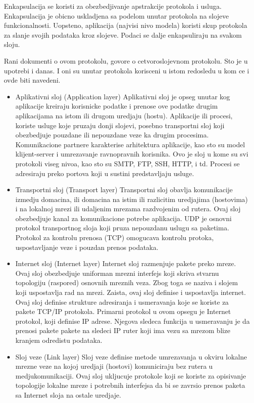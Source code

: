 \documentclass[a4paper,12pt, master]{etf}
\begin{document}
	Enkapsulacija se koristi za obezbedjivanje apstrakcije protokola i usluga. Enkapsulacija je 
	obicno uskladjena sa podelom unutar protokola na slojeve funkcionalnosti. Uopsteno, 
	aplikacija (najvisi nivo modela) koristi skup protokola za slanje svojih podataka kroz 
	slojeve. Podaci se dalje enkapsuliraju na svakom sloju.

	Rani dokumenti o ovom protokolu, govore o cetvoroslojevnom protokolu. Sto je u upotrebi i 
	danas. I oni su unutar protokola korisceni u istom redosledu u kom ce i ovde biti navedeni.

	\begin{itemize}
		\item Aplikativni sloj (Application layer)
		Aplikativni sloj je opseg unutar kog aplikacije kreiraju korisnicke podatke i prenose 
		ove podatke drugim aplikacijama na istom ili drugom uredjaju (hostu). Aplikacije ili 
		procesi, koriste usluge koje pruzaju donji slojevi, posebno transportni sloj koji 
		obezbedjuje pouzdane ili nepouzdane veze ka drugim procesima. Komunikacione partnere 
		karakterise arhitektura aplikacije, kao sto su model klijent-server i umrezavanje 
		ravnopravnih korisnika. Ovo je sloj u kome su svi protokoli viseg nivoa, kao sto su SMTP,
		 FTP, SSH, HTTP, i td. Procesi se adresiraju preko portova koji u sustini predstavljaju 
		 usluge.
		\item Transportni sloj (Transport layer)
		Transportni sloj obavlja komunikacije izmedju domacina, ili domacina na istim ili 
		razlicitim uredjajima (hostovima) i na lokalnoj mrezi ili udaljenim mrezama razdvojenim 
		od rutera. Ovaj sloj obezbedjuje kanal za komunikacione potrebe aplikacija. UDP je 
		osnovni protokol transportnog sloja koji pruza nepouzdanu uslugu sa paketima. Protokol 
		za kontrolu prenosa (TCP) omogucava kontrolu protoka, uspostavljanje veze i pouzdan 
		prenos podataka.
		\item Internet sloj (Internet layer)
		Internet sloj razmenjuje pakete preko mreze. Ovaj sloj obezbedjuje uniforman mrezni 
		interfejs koji skriva stvarnu topologiju (raspored) osnovnih mreznih veza. Zbog toga se 
		naziva i slojem koji uspostavlja rad na mrezi. Zaista, ovaj sloj definise i uspostavlja 
		internet. Ovaj sloj definise strukture adresiranja i usmeravanja koje se koriste za 
		pakete TCP/IP protokola. Primarni protokol u ovom opsegu je Internet protokol, koji 
		definise IP adrese. Njegova sledeca funkcija u usmeravanju je da prenosi pakete pakete 
		na sledeci IP ruter koji ima vezu sa mrezom blize kranjem odredistu podataka.	
		\item Sloj veze (Link layer)
		Sloj veze definise metode umrezavanja u okviru lokalne mrezne veze na kojoj uredjaji 
		(hostovi) komuniciraju bez rutera u medjukomunikaciji. Ovaj sloj ukljucuje protokole 
		koji se koriste za opisivanje topologije lokalne mreze i potrebnih interfejsa da bi se 
		zavrsio prenos paketa sa Internet sloja na ostale uredjaje.
	\end{itemize}
\end{document}
